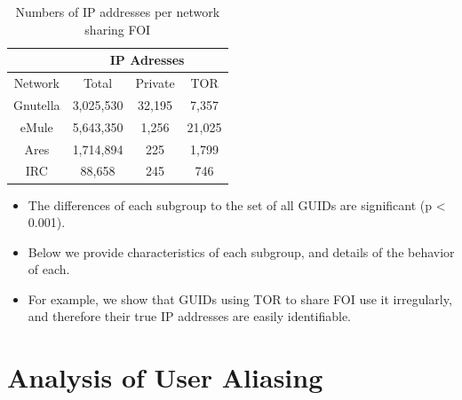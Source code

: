 \documentclass[notes]{beamer}
\begin{document}
\begin{frame}

\begin{block}

\begin{table} 

\centering

\caption{Numbers of IP addresses per network sharing FOI} 
\label{tab:table3}
\begin{tabular}{cccc}\hline & \multicolumn{3}{c}{IP Adresses} \\

\hline 

Network & Total & Private & TOR \\ 

\hline
\hline
Gnutella & 3,025,530 & 32,195 & 7,357 \\
eMule & 5,643,350 & 1,256 & 21,025 \\
Ares & 1,714,894 & 225 & 1,799 \\
IRC & 88,658 & 245 & 746 \\

\hline

\end{tabular}


\end{table}

\end{block}

\end{frame}

\begin{frame}

\begin{itemize}

\item[\checkmark]The differences of each subgroup to the set of all GUIDs are significant (p < 0.001).

\item[\checkmark]Below we provide characteristics of each subgroup, and details of the behavior of each. 

\item[\checkmark]For example, we show that GUIDs using TOR to share FOI use it irregularly, and therefore their true IP addresses are easily identifiable. 

\end{itemize}

\end{frame}

\section{Analysis of User Aliasing}
\begin{frame}

\end{frame}
\end{document}
